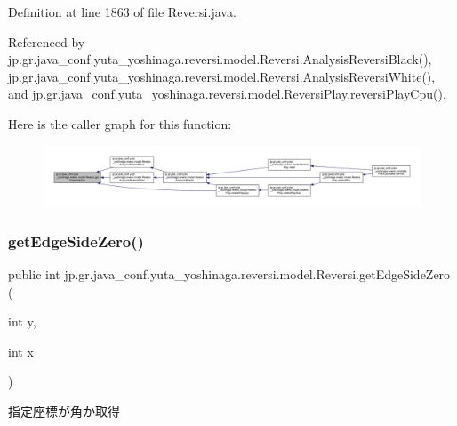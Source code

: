 Definition at line 1863 of file Reversi.\+java.



Referenced by jp.\+gr.\+java\+\_\+conf.\+yuta\+\_\+yoshinaga.\+reversi.\+model.\+Reversi.\+Analysis\+Reversi\+Black(), jp.\+gr.\+java\+\_\+conf.\+yuta\+\_\+yoshinaga.\+reversi.\+model.\+Reversi.\+Analysis\+Reversi\+White(), and jp.\+gr.\+java\+\_\+conf.\+yuta\+\_\+yoshinaga.\+reversi.\+model.\+Reversi\+Play.\+reversi\+Play\+Cpu().

Here is the caller graph for this function\+:
\nopagebreak
\begin{figure}[H]
\begin{center}
\leavevmode
\includegraphics[width=350pt]{classjp_1_1gr_1_1java__conf_1_1yuta__yoshinaga_1_1reversi_1_1model_1_1_reversi_afc0b642f56e39a28ab5adc48c8fd2b98_icgraph}
\end{center}
\end{figure}
\mbox{\label{classjp_1_1gr_1_1java__conf_1_1yuta__yoshinaga_1_1reversi_1_1model_1_1_reversi_a3989b051544745724fc372d4a6b8a7f7}} 
\subsubsection{\texorpdfstring{get\+Edge\+Side\+Zero()}{getEdgeSideZero()}}
{\footnotesize\ttfamily public int jp.\+gr.\+java\+\_\+conf.\+yuta\+\_\+yoshinaga.\+reversi.\+model.\+Reversi.\+get\+Edge\+Side\+Zero (\begin{DoxyParamCaption}\item[{int}]{y,  }\item[{int}]{x }\end{DoxyParamCaption})}



指定座標が角か取得 


